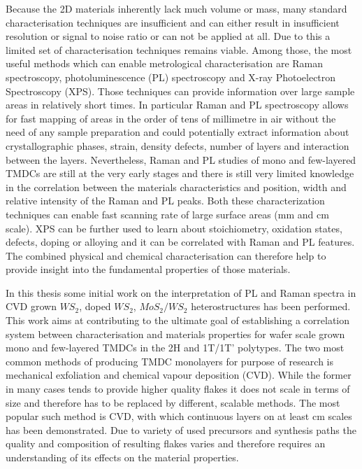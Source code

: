 Because the 2D materials inherently lack much volume or mass, many standard characterisation techniques are insufficient and can either result in insufficient resolution or signal to noise ratio or can not be applied at all. Due to this a limited set of characterisation techniques remains viable. Among those, the most useful methods which can enable metrological characterisation are Raman spectroscopy, photoluminescence (PL) spectroscopy and X-ray Photoelectron Spectroscopy (XPS). Those techniques can provide information over large sample areas in relatively short times. In particular Raman and PL spectroscopy allows for fast mapping of areas in the order of tens of millimetre in air without the need of any sample preparation and could potentially extract information about crystallographic phases, strain, density defects, number of layers and interaction between the layers. Nevertheless, Raman and PL studies of mono and few-layered TMDCs are still at the very early stages and there is still very limited knowledge in the correlation between the materials characteristics and position, width and relative intensity of the Raman and PL peaks.  Both these characterization techniques can enable fast scanning rate of large surface areas (mm and cm scale). XPS can be further used to learn about stoichiometry, oxidation states, defects, doping or alloying and it can be correlated with Raman and PL features. The combined physical and chemical characterisation can therefore help to provide insight into the fundamental properties of those materials.

In this thesis some initial work on the interpretation of PL and Raman spectra in CVD grown $WS_2$, doped $WS_2$, $MoS_2/WS_2$ heterostructures has been performed. This work aims at contributing to the ultimate goal of establishing a correlation system between characterisation and materials properties for wafer scale grown mono and few-layered TMDCs in the 2H and 1T/1T’ polytypes. The two most common methods of producing TMDC monolayers for purpose of research is mechanical exfoliation and chemical vapour deposition (CVD). While the former in many cases tends to provide higher quality flakes it does not scale in terms of size and therefore has to be replaced by different, scalable methods. The most popular such method is CVD, with which continuous layers on at least cm scales has been demonstrated. Due to variety of used precursors and synthesis paths the quality and composition of resulting flakes varies and therefore requires an understanding of its effects on the material properties. 

